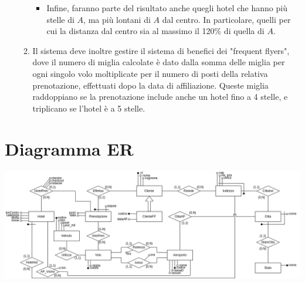 \documentclass[a4paper,12pt]{report}
\begin{document}
\begin{enumerate}[label=\arabic*.]
\begin{enumerate}[label*=\arabic*.]
\begin{itemize}
                  \item Infine, faranno parte del risultato anche quegli hotel che hanno più stelle di $A$, ma più lontani di $A$ dal centro. In particolare, quelli per cui la distanza
                        dal centro sia al massimo il 120\% di quella di $A$.
                \end{itemize}
          \item Il sistema deve inoltre gestire il sistema di benefici dei "frequent flyers", dove il numero di miglia calcolate è dato dalla somma delle miglia per ogni singolo volo moltiplicate
                per il numero di posti della relativa prenotazione, effettuati dopo la data di affiliazione. Queste miglia raddoppiano se la prenotazione include anche un hotel fino a 4 stelle,
                e triplicano se l'hotel è a 5 stelle.
      \end{enumerate}
    \end{enumerate}

  \chapter{Diagramma ER}
    \includegraphics[width=1\textwidth]{er.png}
\end{document}
